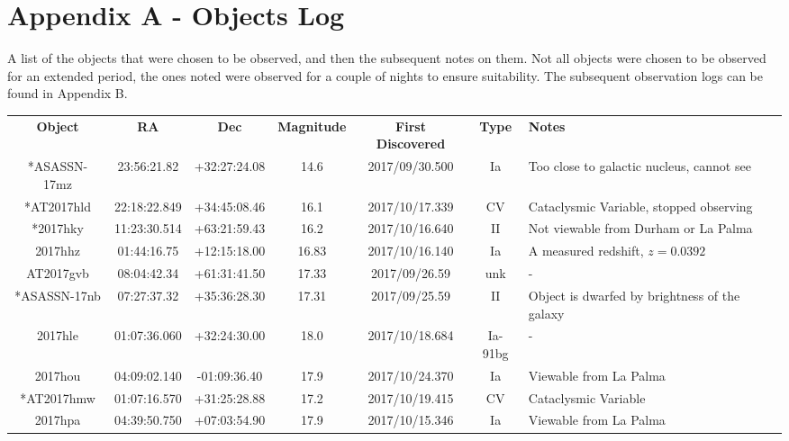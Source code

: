 \documentclass[twocolumn]{revtex4}
\begin{document}



\clearpage
\onecolumngrid
\vspace{-3ex}
\section*{Appendix A - Objects Log} \label{objectslog}
\vspace{-2ex}
A list of the objects that were chosen to be observed, and then the subsequent notes on them. Not all objects were chosen to be observed for an extended period, the ones noted were observed for a couple of nights to ensure suitability. The subsequent observation logs can be found in Appendix B.

{\renewcommand{\arraystretch}{1.2}%
\begin{table}[h!]
\centering    
\begin{tabularx}{\textwidth}{c c c c @{\hskip 5pt} c c X}
    \hline
    \textbf{Object} & \textbf{RA} & \textbf{Dec} & \textbf{Magnitude} &\textbf{First Discovered} &\textbf{Type} & \textbf{Notes} \\ 
    *ASASSN-17mz & 23:56:21.82 & +32:27:24.08 & 14.6 & 2017/09/30.500 & Ia & {Too close to galactic nucleus, cannot see}  \\
    *AT2017hld & 22:18:22.849 & +34:45:08.46 & 16.1 & 2017/10/17.339 & CV & {Cataclysmic Variable, stopped observing}  \\
    *2017hky & 11:23:30.514 & +63:21:59.43 & 16.2 & 2017/10/16.640 & II & {Not viewable from Durham or La Palma}  \\
    2017hhz & 01:44:16.75 & +12:15:18.00 & 16.83 & 2017/10/16.140 & Ia & {A measured redshift, $z=0.0392$}  \\
    AT2017gvb & 08:04:42.34 & +61:31:41.50 & 17.33 & 2017/09/26.59 & unk & {-}  \\
    *ASASSN-17nb & 07:27:37.32 & +35:36:28.30 & 17.31 & 2017/09/25.59 & II & {Object is dwarfed by brightness of the galaxy}  \\
    2017hle & 01:07:36.060 & +32:24:30.00 & 18.0 & 2017/10/18.684 & Ia-91bg & {-}  \\
    2017hou & 04:09:02.140 & -01:09:36.40 & 17.9 & 2017/10/24.370 &Ia & {Viewable from La Palma}  \\
    *AT2017hmw & 01:07:16.570 & +31:25:28.88 & 17.2 & 2017/10/19.415 & CV & {Cataclysmic Variable}  \\
    2017hpa & 04:39:50.750 & +07:03:54.90 & 17.9 & 2017/10/15.346 & Ia & {Viewable from La Palma}  \\

\end{tabularx}
\end{table}}
\end{document}
